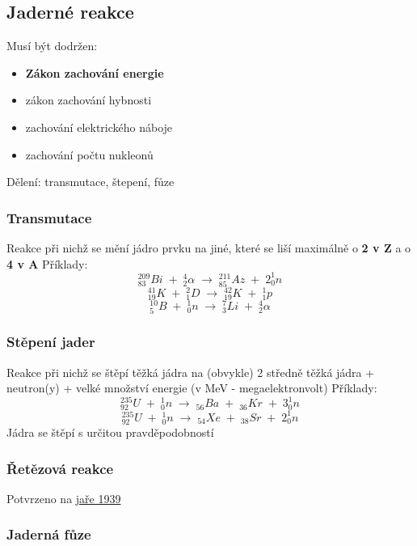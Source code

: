 \subsection{Jaderné reakce}
Musí být dodržen:
\begin{itemize}
    \item \textbf{Zákon zachování energie}
    \item zákon zachování hybnosti
    \item zachování elektrického náboje
    \item zachování počtu nukleonů
\end{itemize}

Dělení: transmutace, štepení, fůze

\subsubsection{Transmutace}
Reakce při nichž se mění jádro prvku na jiné, které se liší maximálně o \textbf{2 v Z} a o \textbf{4 v A}
Příklady:
\[^{209}_{83}Bi \; + \; ^4_2\alpha \; \longrightarrow \; ^{211}_{85}Az \; + \; 2^1_0n\]
\vspace{0.2em}
\[^{41}_{19}K \; + \; ^2_1D \; \longrightarrow \; ^{42}_{19}K \; + \; ^1_1p\]
\vspace{0.2em}
\[^{10}_{5}B \; + \; ^1_0n \; \longrightarrow \; ^{7}_{3}Li \; + \; ^4_2\alpha\]

\subsubsection{Stěpení jader}
Reakce při nichž se štěpí těžká jádra na (obvykle) 2 středně těžká jádra + neutron(y) + velké množství energie (v MeV - megaelektronvolt)
Příklady:
\[^{235}_{92}U \; + \; ^1_0n \; \longrightarrow \; _{56}Ba \; + \; _{36}Kr \; + \; 3^1_0n\]
\vspace{0.1em}
\[^{235}_{92}U \; + \; ^1_0n \; \longrightarrow \; _{54}Xe \; + \; _{38}Sr \; + \; 2^1_0n\]
Jádra se štěpí s určitou pravděpodobností

\subsubsection{Řetězová reakce}
Potvrzeno na \underline{jaře 1939}

\subsubsection{Jaderná fůze}
